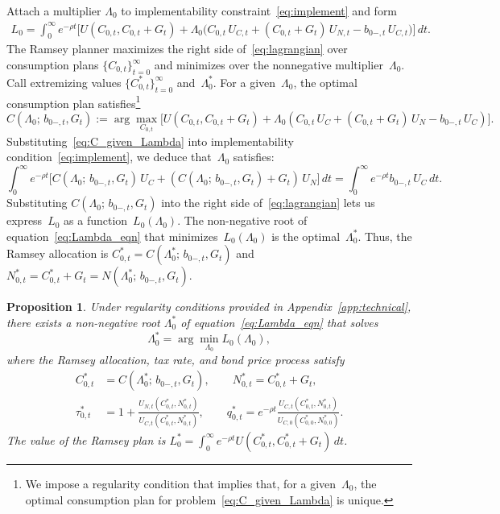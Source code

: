\documentclass[12pt]{article}
\newtheorem{proposition}{Proposition}
\begin{document}
{Attach a multiplier $\Lambda_0$ to implementability constraint~{\eqref{eq:implement}} and form %
\begin{multline}\label{eq:lagrangian}
L_0 = \int_0^\infty e^{-\rho t}\Big[U(C_{0,t}, C_{0,t}+G_t) 
+ \Lambda_0\bigl(C_{0,t}\, U_{C,t} + (C_{0,t}+G_t)\, U_{N,t} - b_{0-,t}\, U_{C,t}\bigr)\Big]\, dt.
\end{multline}
The Ramsey planner maximizes the right side of~\eqref{eq:lagrangian} over consumption plans $\{C_{0,t}\}_{t=0}^\infty$ and minimizes over the nonnegative multiplier~$\Lambda_0$. Call  extremizing values $\{C_{0,t}^*\}_{t=0}^\infty$ and~$\Lambda_0^*$. For a given~$\Lambda_0$, the optimal consumption plan satisfies\footnote{We impose  a regularity condition that implies that,  for a given~$\Lambda_0$, the optimal consumption plan for  problem~\eqref{eq:C_given_Lambda} is unique.}
\begin{equation}\label{eq:C_given_Lambda}
C(\Lambda_0;\, b_{0-,t}, G_t) := \arg\max_{C_{0,t}} \bigl[U(C_{0,t},C_{0,t}+G_t) + \Lambda_0(C_{0,t}\, U_C + (C_{0,t}+G_t)\, U_N - b_{0-,t}\, U_C)\bigr].
\end{equation}
Substituting~\eqref{eq:C_given_Lambda} into implementability condition~\eqref{eq:implement}, we deduce that~$\Lambda_0$ satisfies:
\begin{equation}\label{eq:Lambda_eqn}
\int_0^\infty e^{-\rho t}\bigl[C(\Lambda_0;\, b_{0-,t}, G_t)\, U_C + (C(\Lambda_0;\, b_{0-,t}, G_t)+G_t)\, U_N\bigr]\, dt = \int_0^\infty e^{-\rho t} b_{0-,t}\, U_C\, dt.
\end{equation}
Substituting $C(\Lambda_0;\, b_{0-,t}, G_t)$ into the right side of~\eqref{eq:lagrangian} lets us express~$L_0$ as a function~$L_0(\Lambda_0)$.
The non-negative root of equation~\eqref{eq:Lambda_eqn} that {minimizes}~$L_0(\Lambda_0)$ is the optimal~$\Lambda_0^*$.
%
Thus, the Ramsey allocation is $C_{0,t}^* = C(\Lambda_0^*;\, b_{0-,t}, G_t)$ and $N_{0,t}^* = C_{0,t}^* + G_t = N(\Lambda_0^*;\, b_{0-,t}, G_t)$.

\begin{proposition}\label{prop:ramsey_lagrangian}
	Under regularity conditions provided in Appendix~\ref{app:technical}, there exists a non-negative root $\Lambda_0^*$ of equation~\eqref{eq:Lambda_eqn} that solves
	\[
	\Lambda_0^* = \arg\min_{\Lambda_0} L_0(\Lambda_0),
	\]
	where the Ramsey allocation, tax rate, and bond price process satisfy
	\begin{align*}
	C_{0,t}^* &= C(\Lambda_0^*;\, b_{0-,t}, G_t), \qquad N_{0,t}^* = C_{0,t}^* + G_t, \\
	\tau_{0,t}^* &= 1 + \frac{U_{N,t}(C_{0,t}^*,N_{0,t}^*)}{U_{C,t}(C_{0,t}^*,N_{0,t}^*)}, \qquad q_{0,t}^* = e^{-\rho t}\frac{U_{C,t}(C_{0,t}^*,N_{0,t}^*)}{U_{C,0}(C_{0,0}^*,N_{0,0}^*)}.
	\end{align*}
	The value of the Ramsey plan is $L_0^* =  \int_0^\infty e^{-\rho t} U(C_{0,t}^*, C_{0,t}^*+G_t)\, dt$.
\end{proposition}


}
\end{document}
